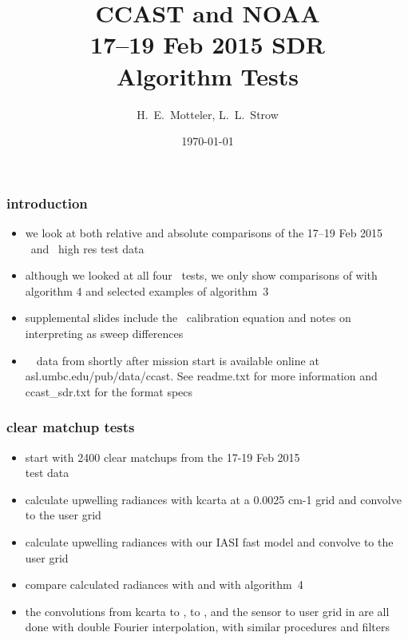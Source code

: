 \documentclass[11pt]{beamer}
\title{CCAST and NOAA \\
  17--19 Feb 2015 SDR \\
  Algorithm Tests}
\author{H.~E.~Motteler, L.~L.~Strow}
\institute{
  UMBC Atmospheric Spectroscopy Lab \\
  Joint Center for Earth Systems Technology \\
}
\date{\today}
\begin{document}
\begin{frame}[plain]
\titlepage
\end{frame}
\begin{frame}
\frametitle{introduction}

\begin{itemize}

  \item we look at both relative and absolute comparisons of the
    17--19 Feb 2015 \ccast\ and \noaa\ high res {\sdr} test data

  \item although we looked at all four \noaa\ tests, we only show
    comparisons of {\ccast} with {\noaa} algorithm 4 and selected
    examples of algorithm~3

  \item supplemental slides include the \ccast\ calibration equation
    and notes on interpreting {\for} as sweep differences

  \item \ccast\ \sdr\ data from shortly after mission start is
    available online at asl.umbc.edu/pub/data/ccast.  See readme.txt
    for more information and ccast\_sdr.txt for the {\sdr} format
    specs

\end{itemize}

\end{frame}
\begin{frame}
\frametitle{clear matchup tests}

\begin{itemize}

  \item start with 2400 clear matchups from the 17-19 Feb 2015 \\
    test data

  \item calculate upwelling radiances with kcarta at a 0.0025 cm-1
    grid and convolve to the {\cris} user grid

  \item calculate upwelling radiances with our IASI fast model and
    convolve to the {\cris} user grid

  \item compare calculated radiances with {\ccast} and with {\noaa}
    algorithm~4

  \item the convolutions from kcarta to \cris, {\iasi} to \cris, and
    the {\cris} sensor to user grid in {\ccast} are all done with
    double Fourier interpolation, with similar procedures and filters
    
\end{itemize}

\end{frame}
\end{document}
